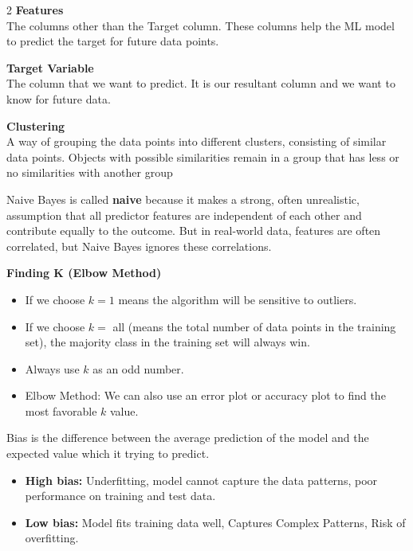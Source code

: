 \begin{multicols}{2}
\textbf{Features}\\
The columns other than the Target column. These columns help the ML model to predict the target for future data points.

\textbf{Target Variable}\\
The column that we want to predict. It is our resultant column and we want to know for future data.

\textbf{Clustering}\\
A way of grouping the data points into different clusters, consisting
of similar data points. Objects with possible similarities remain in a group that has less or no similarities with another group


Naive Bayes is called \textbf{naive} because it makes a strong, often unrealistic, assumption that all predictor features are independent of each other and contribute equally to the outcome. But in real-world data, features are often correlated, but Naive Bayes ignores these correlations.

\textbf{Finding K (Elbow Method)}
\begin{itemize}[topsep=-0.5em, parsep=0.5em]
\item If we choose $k =1$ means the algorithm will be sensitive to outliers.
\item If we choose $k=$ all (means the total number of data points in the training set), the majority class in the training set will always win.
\item Always use $k$ as an odd number.
\item Elbow Method: We can also use an error plot or accuracy plot to find the most favorable $k$ value.
\end{itemize}

{}
Bias is the difference between the average prediction of the model
and the expected value which it trying to predict.

\begin{itemize}[topsep=-0.5em, parsep=0.5em]
\item \textbf{High bias:} Underfitting, model cannot capture the data patterns, poor performance on training and test data.
\item	\textbf{Low bias:} Model fits training data well, Captures Complex Patterns, Risk of overfitting.
\end{itemize}


\end{multicols}
